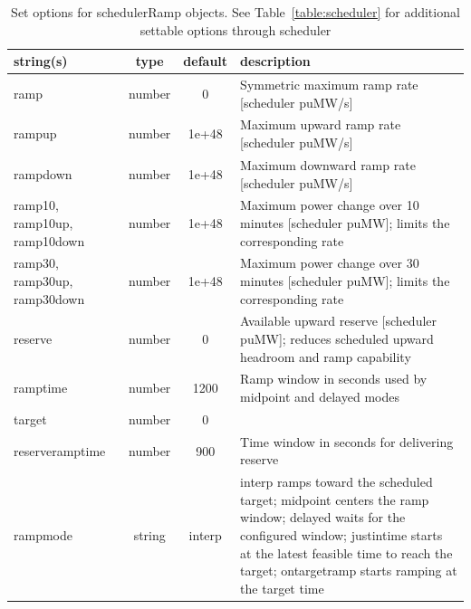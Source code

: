 \begin{table}[ht]
\centering
\begin{tabular}{p{5cm} c c p{7cm}}
\hline
string(s) & type & default & description \\
\hline
ramp & number & 0 & Symmetric maximum ramp rate [scheduler puMW/s]\\
rampup & number & 1e+48 & Maximum upward ramp rate [scheduler puMW/s]\\
rampdown & number & 1e+48 & Maximum downward ramp rate [scheduler puMW/s]\\
ramp10, ramp10up, ramp10down & number & 1e+48 & Maximum power change over 10 minutes [scheduler puMW]; limits the corresponding rate\\
ramp30, ramp30up, ramp30down & number & 1e+48 & Maximum power change over 30 minutes [scheduler puMW]; limits the corresponding rate\\
reserve & number & 0 & Available upward reserve [scheduler puMW]; reduces scheduled upward headroom and ramp capability\\
ramptime & number & 1200 & Ramp window in seconds used by midpoint and delayed modes\\
target & number & 0 & \\
reserveramptime & number & 900 & Time window in seconds for delivering reserve\\
rampmode & string & interp & interp ramps toward the scheduled target; midpoint centers the ramp window; delayed waits for the configured window; justintime starts at the latest feasible time to reach the target; ontargetramp starts ramping at the target time\\
\hline
\end{tabular}
\caption{Set options for schedulerRamp objects. See Table~\ref{table:scheduler} for additional settable options through scheduler}
\label{table:schedulerRamp}
\end{table}
